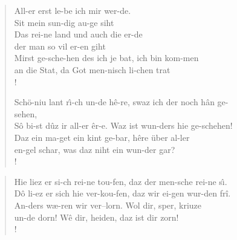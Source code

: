 \documentclass{article}
\begin{document}
\begin{center}
\framebox{\parbox{170mm}{
\begin{mus}  \end{mus}
}}
\framebox{
\begin{minipage}{170mm}
\begin{mus}  \end{mus}
\end{minipage}
}
\end{center}

\begin{figure}[h!]
\begin{minipage}{85mm}
\begin{verse} 
All-er erst le-be ich mir wer-de. \\
Sit mein sun-dig au-ge siht \\
Das rei-ne land und auch die er-de \\
der man so vil er-en giht \\ 
Mirst ge-sche-hen des ich je bat, ich bin kom-men \\
an die Stat, da Got men-nisch li-chen trat\\!


Sch\"o-niu lant r\^\i-ch un-de h\^e-re, swaz ich der noch h\^an ge-sehen, \\
S\^o bi-st d\^uz ir all-er \^er-e. Waz ist wun-ders hie ge-schehen! \\
Daz ein ma-get ein kint ge-bar, h\^ere \"uber al-ler  \\
en-gel schar, was daz niht ein wun-der gar?  \\!
\end{verse}
\end{minipage}
\begin{minipage}{85mm}
\begin{verse} 
Hie liez er si-ch rei-ne tou-fen, daz der men-sche rei-ne s\^\i. \\
D\^o li-ez er sich hie ver-kou-fen, daz wir ei-gen wur-den fr\^i. \\
An-ders w\ae-ren wir ver--lorn. Wol dir, sper, kriuze   \\
un-de dorn! W\^e dir, heiden, daz ist dir zorn! \\!
\end{verse}
\end{minipage}

\end{figure}
\end{document}
